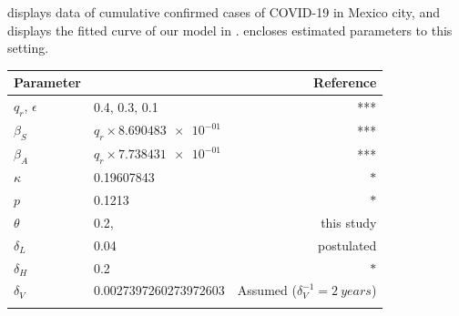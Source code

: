 displays data of cumulative confirmed cases
of COVID-19 in Mexico city, and  displays the fitted curve
of our model in .
 encloses estimated parameters to this
setting.

  \begin{table}
    \centering
    \begin{tabular}{@{}llr@{}}
    \toprule
        Parameter
        &   \centering{Median}
        &   Reference
        \\
        \midrule
          $q_r$, $\epsilon$
            &
              \num{.4}, \num{.3}, \num{.1}
            &
              ***
        \\
            $\beta_S$
            & $q_r \times \num{8.690483e-01} $
            & ***
        \\
            $\beta_A$
            & $q_r \times \num{7.738431e-01}$
            & ***

        \\
            $\kappa$
            & \num{0.19607843}
            & $*$
        \\
            $p$
            & \num{0.1213}
            & $*$
        \\
          $\theta$
          & \num{0.2},
          & this study
        \\
          $\delta_L$
          & \num{0.04}
          & postulated
        \\
            $\delta_H$
            &\num{0.2}
            & $*$
        \\
          $\delta_V$
          &\num{ 0.0027397260273972603}
          & Assumed ($\delta_V ^{-1} = \SI{2}{years}$)
        \\
        &&


\end{tabular}
\end{table}
